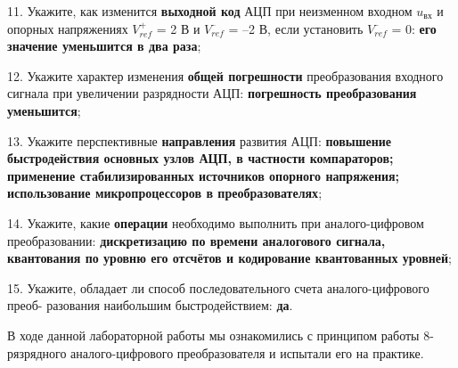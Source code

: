 \documentclass[spec, och, otchet, hidelinks]{SCWorks}
\begin{document}
\par 11. Укажите, как изменится \textbf{выходной код} АЦП при неизменном входном $u_\text{вх}$ и опорных напряжениях $V_{ref}^{+}$ = 2 В и $V_{ref}^{–}$
 = –2 В, если установить $V_{ref}^{–}$ = 0: \textbf{его значение уменьшится в два раза};

\par 12. Укажите характер изменения \textbf{общей погрешности} преобразования входного сигнала при увеличении разрядности АЦП: \textbf{погрешность преобразования уменьшится};

\par 13. Укажите перспективные \textbf{направления} развития АЦП: \textbf{повышение быстродействия основных узлов АЦП, в частности компараторов; применение
стабилизированных источников опорного напряжения; использование микропроцессоров в преобразователях};

\par 14. Укажите, какие \textbf{операции} необходимо выполнить при аналого-цифровом преобразовании: \textbf{дискретизацию по времени аналогового сигнала, 
квантования по уровню его отсчётов и кодирование квантованных уровней};

\par 15. Укажите, обладает ли способ последовательного счета аналого-цифрового преоб-
разования наибольшим быстродействием: \textbf{да}.

\newpage

\conclusion

В ходе данной лабораторной работы мы ознакомились с принципом работы 8-рязрядного аналого-цифрового преобразователя и испытали его на практике.
\end{document}
